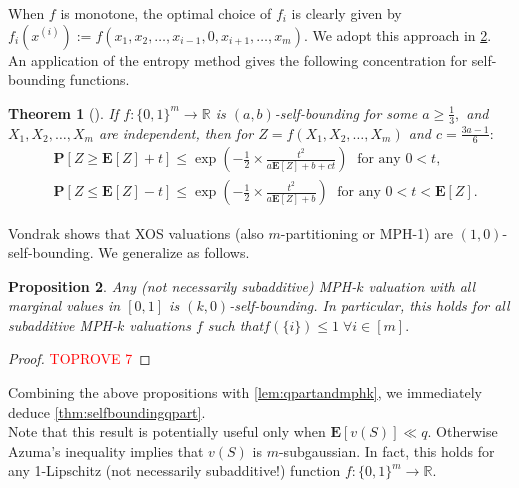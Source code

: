 \documentclass[11pt]{article}%
\newtheorem{theorem}{Theorem}
\newtheorem{proposition}[theorem]{Proposition}
\numberwithin{theorem}{subsection}
\newcommand{\prob}{\mathbf{P}}
\newcommand{\expect}{\mathbf{E}}
\begin{document}
\noindent
When $f$ is monotone, the optimal choice of $f_i$ is clearly given by\linebreak
$f_i(x^{(i)}):=f(x_1, x_2, \ldots, x_{i-1},0, x_{i+1}, \ldots, x_m).$ We adopt this approach in \cref{lem:MPHslefbounding}.
An application of the entropy method gives the following concentration for self-bounding functions.

\begin{theorem}[{\cite[Theorem 3.3]{Vondrak10}}]If $f:\{0,1\}^m\longrightarrow \mathbb{R}$ is $(a,b)$-self-bounding for some $a\ge \frac{1}{3},$ and $X_1, X_2, \ldots, X_m$ are independent, then for $Z = f(X_1, X_2, \ldots, X_m)$ and $c = \frac{3a-1}{6}:$
\begin{equation*}
\begin{split}
    & \prob[Z\ge \expect[Z] + t]\le
\exp\left(-\frac{1}{2}\times\frac{t^2}{a\expect[Z] + b + ct}\right)\; \text{ for any }0<t,\\
    &
     \prob[Z\le \expect[Z] - t]\le
     \exp\left(-\frac{1}{2}\times\frac{t^2}{a\expect[Z] + b}\right)\;\text{ for any }0<t<\expect[Z].
\end{split}
\end{equation*}
\end{theorem}

\noindent
Vondrak \cite[Lemma 2.2]{Vondrak10} shows that XOS valuations (also $m$-partitioning or MPH-1) are $(1,0)$-self-bounding.
We generalize as follows.

\begin{proposition}
\label{lem:MPHslefbounding}
Any (not necessarily subadditive) MPH-$k$ valuation with all marginal values in $[0,1]$ is $(k,0)$-self-bounding. In particular, this holds for all subadditive MPH-$k$ valuations $f$ such that\linebreak $f(\{i\})\le 1\; \forall i \in [m].$
\end{proposition}
\begin{proof}\textcolor{red}{TOPROVE 7}\end{proof}

\noindent
Combining the above propositions with \cref{lem:qpartandmphk}, we immediately deduce \cref{thm:selfboundingqpart}.\\

\noindent
Note that this result is potentially useful only when $\expect[v(S)] \ll q.$ Otherwise Azuma's inequality \cite{Azuma} implies that $v(S)$ is $m$-subgaussian. In fact, this holds for any 1-Lipschitz (not necessarily subadditive!) function $f:\{0,1\}^m\longrightarrow \mathbb{R}.$\\
\end{document}
